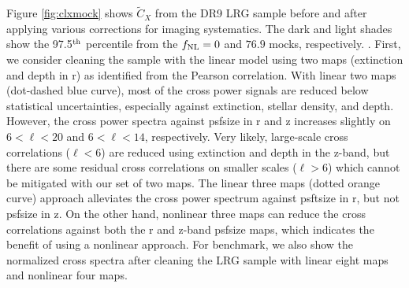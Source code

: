 Figure \ref{fig:clxmock} shows $\tilde{C}_{X}$ from the DR9 LRG sample before and after applying various corrections for imaging systematics. The dark and light shades show the 97.5$^{\rm th}$ percentile from the $f_{\rm NL}=0$ and $76.9$ mocks, respectively. . First, we consider cleaning the sample with the linear model using two maps (extinction and depth in r) as identified from the Pearson correlation. With linear two maps (dot-dashed blue curve), most of the cross power signals are reduced below statistical uncertainties, especially against extinction, stellar density, and depth. However, the cross power spectra against psfsize in r and z increases slightly on $6<\ell<20$ and $6<\ell<14$, respectively. Very likely, large-scale cross correlations ($\ell < 6$) are reduced using extinction and depth in the z-band, but there are some residual cross correlations on smaller scales ($\ell > 6$) which cannot be mitigated with our set of two maps. The linear three maps (dotted orange curve) approach alleviates the cross power spectrum against psftsize in r, but not psfsize in z. On the other hand, nonlinear three maps can reduce the cross correlations against both the r and z-band psfsize maps, which indicates the benefit of using a nonlinear approach. For benchmark, we also show the normalized cross spectra after cleaning the LRG sample with linear eight maps and nonlinear four maps. 

